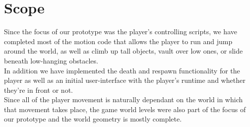 \documentclass[a4paper,10pt]{article}
\begin{document}
\section{Scope}
Since the focus of our prototype was the player's controlling scripts, we have completed most of the motion code that allows the player to run and jump around the world, as well as climb up tall objects, vault over low ones, or slide beneath low-hanging obstacles. \\
In addition we have implemented the death and respawn functionality for the player as well as an initial user-interface with the player's runtime and whether they're in front or not. \\
Since all of the player movement is naturally dependant on the world in which that movement takes place, the game world levels were also part of the focus of our prototype and the world geometry is mostly complete.
\end{document}
